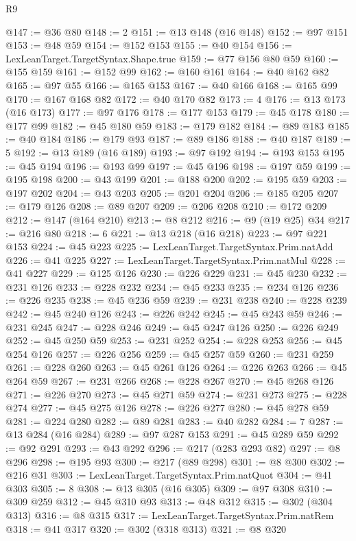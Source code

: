 \begin{lexlean}{R9}
\begin{coremodule}
@147 := @36 @80
@148 := 2
@151 := @13 @148 (@16 @148)
@152 := @97 @151
@153 := @48 @59
@154 := @152 @153
@155 := @40 @154
@156 := LexLeanTarget.TargetSyntax.Shape.true
@159 := @77 @156 @80 @59
@160 := @155 @159
@161 := @152 @99
@162 := @160 @161
@164 := @40 @162 @82
@165 := @97 @55
@166 := @165 @153
@167 := @40 @166
@168 := @165 @99
@170 := @167 @168 @82
@172 := @40 @170 @82
@173 := 4
@176 := @13 @173 (@16 @173)
@177 := @97 @176
@178 := @177 @153
@179 := @45 @178
@180 := @177 @99
@182 := @45 @180 @59
@183 := @179 @182
@184 := @89 @183
@185 := @40 @184
@186 := @179 @93
@187 := @89 @186
@188 := @40 @187
@189 := 5
@192 := @13 @189 (@16 @189)
@193 := @97 @192
@194 := @193 @153
@195 := @45 @194
@196 := @193 @99
@197 := @45 @196
@198 := @197 @59
@199 := @195 @198
@200 := @43 @199
@201 := @188 @200
@202 := @195 @59
@203 := @197 @202
@204 := @43 @203
@205 := @201 @204
@206 := @185 @205
@207 := @179 @126
@208 := @89 @207
@209 := @206 @208
@210 := @172 @209
@212 := @147 (@164 @210)
@213 := @8 @212
@216 := @9 (@19 @25) @34
@217 := @216 @80
@218 := 6
@221 := @13 @218 (@16 @218)
@223 := @97 @221 @153
@224 := @45 @223
@225 := LexLeanTarget.TargetSyntax.Prim.natAdd
@226 := @41 @225
@227 := LexLeanTarget.TargetSyntax.Prim.natMul
@228 := @41 @227
@229 := @125 @126
@230 := @226 @229
@231 := @45 @230
@232 := @231 @126
@233 := @228 @232
@234 := @45 @233
@235 := @234 @126
@236 := @226 @235
@238 := @45 @236 @59
@239 := @231 @238
@240 := @228 @239
@242 := @45 @240 @126
@243 := @226 @242
@245 := @45 @243 @59
@246 := @231 @245
@247 := @228 @246
@249 := @45 @247 @126
@250 := @226 @249
@252 := @45 @250 @59
@253 := @231 @252
@254 := @228 @253
@256 := @45 @254 @126
@257 := @226 @256
@259 := @45 @257 @59
@260 := @231 @259
@261 := @228 @260
@263 := @45 @261 @126
@264 := @226 @263
@266 := @45 @264 @59
@267 := @231 @266
@268 := @228 @267
@270 := @45 @268 @126
@271 := @226 @270
@273 := @45 @271 @59
@274 := @231 @273
@275 := @228 @274
@277 := @45 @275 @126
@278 := @226 @277
@280 := @45 @278 @59
@281 := @224 @280
@282 := @89 @281
@283 := @40 @282
@284 := 7
@287 := @13 @284 (@16 @284)
@289 := @97 @287 @153
@291 := @45 @289 @59
@292 := @92 @291
@293 := @43 @292
@296 := @217 (@283 @293 @82)
@297 := @8 @296
@298 := @195 @93
@300 := @217 (@89 @298)
@301 := @8 @300
@302 := @216 @31
@303 := LexLeanTarget.TargetSyntax.Prim.natQuot
@304 := @41 @303
@305 := 8
@308 := @13 @305 (@16 @305)
@309 := @97 @308
@310 := @309 @259
@312 := @45 @310 @93
@313 := @48 @312
@315 := @302 (@304 @313)
@316 := @8 @315
@317 := LexLeanTarget.TargetSyntax.Prim.natRem
@318 := @41 @317
@320 := @302 (@318 @313)
@321 := @8 @320

\end{coremodule}
\end{lexlean}
